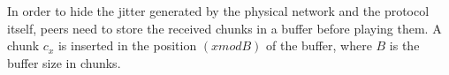 \label{sec:chunk_buffering}
In order to hide the jitter generated by the physical network and the
protocol itself, peers need to store the received chunks in a buffer
before playing them. A chunk $c_x$ is inserted in the position
$(x \mathit{mod} B)$ of the buffer, where $B$ is the buffer size in
chunks.
